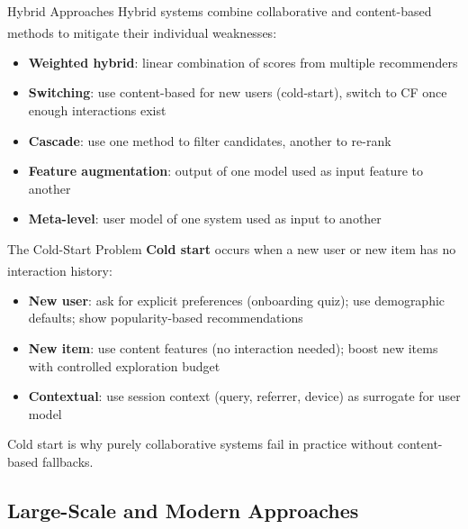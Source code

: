 \begin{v3topic}{Hybrid Approaches}
    Hybrid systems combine collaborative and content-based methods to mitigate their individual weaknesses\textsuperscript{\cite[][pp.~80--87]{jannachRecommenderSystemsIntroduction2010}}:
    \begin{itemize}
        \item \textbf{Weighted hybrid}: linear combination of scores from multiple recommenders
        \item \textbf{Switching}: use content-based for new users (cold-start), switch to CF once enough interactions exist
        \item \textbf{Cascade}: use one method to filter candidates, another to re-rank
        \item \textbf{Feature augmentation}: output of one model used as input feature to another
        \item \textbf{Meta-level}: user model of one system used as input to another
    \end{itemize}

\end{v3topic}
\begin{v3topic}{The Cold-Start Problem}
    \textbf{Cold start} occurs when a new user or new item has no interaction history\textsuperscript{\cite[][pp.~88--92]{aggarwalRecommenderSystems2016}}:
    \begin{itemize}
        \item \textbf{New user}: ask for explicit preferences (onboarding quiz); use demographic defaults; show popularity-based recommendations
        \item \textbf{New item}: use content features (no interaction needed); boost new items with controlled exploration budget
        \item \textbf{Contextual}: use session context (query, referrer, device) as surrogate for user model
    \end{itemize}
    Cold start is why purely collaborative systems fail in practice without content-based fallbacks.

\end{v3topic}

\subsection{Large-Scale and Modern Approaches}



